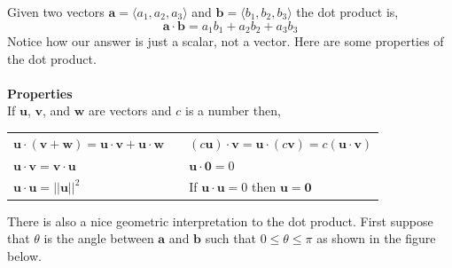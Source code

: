 \documentclass[10pt,reqno]{book}
\theoremstyle{definition}
\renewcommand{\vec}[1]{\mathbf{#1}}
\begin{document}
	Given two vectors $\vec{a} = \langle a_1,a_2,a_3 \rangle$ and $\vec{b} = \langle b_1,b_2,b_3 \rangle$ the dot product is,
	\begin{equation}
		\vec{a} \cdot \vec{b} = a_1b_1 + a_2b_2 + a_3b_3
	\end{equation}
	Notice how our answer is just a scalar, not a vector. Here are some properties of the dot product.\\ \\
	\textbf{Properties}\\
	If $\vec{u}$, $\vec{v}$, and $\vec{w}$ are vectors and $c$ is a number then,
	\begin{center}
		\begin{tabular}{lcl}
			$\vec{u} \cdot (\vec{v} + \vec{w}) = \vec{u} \cdot \vec{v} + \vec{u} \cdot \vec{w}$ & & $(c\vec{u}) \cdot \vec{v} = \vec{u} \cdot (c\vec{v}) = c (\vec{u} \cdot \vec{v})$\\
			$\vec{u} \cdot \vec{v} = \vec{v} \cdot \vec{u}$ & & $\vec{u} \cdot \vec{0} = 0$\\
			$\vec{u} \cdot \vec{u} = ||\vec{u}||^2$ & & If $\vec{u} \cdot \vec{u} = 0$ then $\vec{u} = \vec{0}$
		\end{tabular}
	\end{center}
	There is also a nice geometric interpretation to the dot product. First suppose that $\theta$ is the angle between $\vec{a}$ and $\vec{b}$ such that $0 \leq \theta \leq \pi$ as shown in the figure below.
\end{document}
